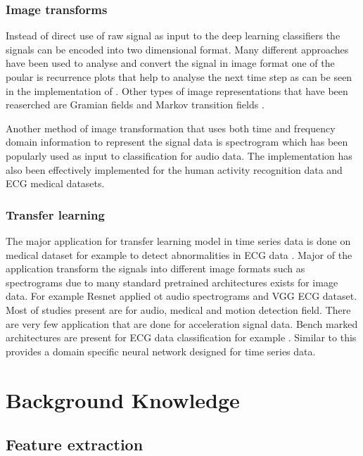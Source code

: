       \subsection{Image transforms}
      Instead of direct use of raw signal as input to the deep learning classifiers the signals can be encoded into two dimensional format. Many different approaches have been used to analyse and convert the signal in image format one of the poular is recurrence plots that help to analyse the next time step as can be seen in the implementation of \cite{thanaraj2020implementation}. Other types of image representations that have been reaserched are Gramian fields and  Markov transition fields \cite{wang2015imaging}.
      
      Another method of image transformation that uses both time and frequency domain information to represent the signal data is spectrogram which has been popularly used as input to classification for audio data. The implementation has also been effectively implemented for the human activity recognition data and ECG medical datasets.
      

   \subsection{Transfer learning}
  
  The major application for transfer learning model in time series data is done on medical dataset for example to detect abnormalities in ECG data \cite{o2021deep}. Major of the application transform  the signals into different image formats such as spectrograms due to many standard pretrained architectures exists for image data. For example Resnet \cite{ouyang2017audio} applied ot audio spectrograms and VGG \cite{russo2019classification} ECG dataset. 
  Most of studies present are for audio, medical and motion detection field. There are very few application that are done for acceleration signal data. Bench marked architectures are present for ECG data classification for example \cite{strodthoff2020deep}.  Similar to this \cite{yosinski2014transferable} provides a domain specific neural network designed for time series data.

  
  
    
    \chapter{Background Knowledge}
     \section{Feature extraction}
  
